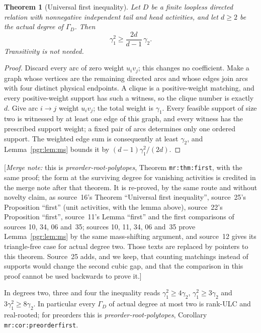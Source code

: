 \documentclass[11pt]{article}
\numberwithin{equation}{section}
\newtheorem{theorem}{Theorem}[section]\newtheorem{lemma}[theorem]{Lemma}\newtheorem{proposition}[theorem]{Proposition}\newtheorem{corollary}[theorem]{Corollary}
\theoremstyle{definition}\newtheorem{definition}[theorem]{Definition}\newtheorem{remark}[theorem]{Remark}
\newcommand{\Ga}{\Gamma}                   %
\newcommand{\mnote}[1]{[\textit{Merge note:} #1]}
\newcommand{\prp}{\emph{preorder-root-polytopes}}
\begin{document}
\begin{theorem}[Universal first inequality]\label{pgr:thm:first}
Let $D$ be a finite loopless directed relation with nonnegative independent
tail and head activities, and let $d\ge2$ be the actual degree of $\Ga_D$.
Then
\begin{equation}\label{pgr:eq:first}
 \gamma_1^2\ge\frac{2d}{d-1}\,\gamma_2 .
\end{equation}
Transitivity is not needed.
\end{theorem}
\begin{proof}
Discard every arc of zero weight $u_iv_j$; this changes no coefficient.
Make a graph whose vertices are the remaining directed arcs and whose edges
join arcs with four distinct physical endpoints. A clique is a
positive-weight matching, and every positive-weight support has such a
witness, so the clique number is exactly~$d$. Give arc $i\to j$ weight
$u_iv_j$; the total weight is $\gamma_1$. Every feasible support of size two
is witnessed by at least one edge of this graph, and every witness has the
prescribed support weight; a fixed pair of arcs determines only one ordered
support. The weighted edge sum is consequently at least $\gamma_2$, and
Lemma~\ref{pgr:lem:ms} bounds it by $(d-1)\gamma_1^2/(2d)$.
\end{proof}
\mnote{this is \prp, Theorem \texttt{mr:thm:first}, with the same proof;
the form at the surviving degree for vanishing activities is credited in
the merge note after that theorem. It is re-proved, by the same route and
without novelty claim, as source~16's Theorem ``Universal first
inequality'', source~25's Proposition ``first'' (unit activities, with the
lemma above), source~22's Proposition ``first'', source~11's Lemma
``first'' and the first comparisons of sources 10, 34, 06 and~35; sources %
10, 11, 34, 06 and~35 prove Lemma~\ref{pgr:lem:ms} by the same mass-shifting
argument, and source~12 gives its triangle-free case for actual degree two.
Those texts are replaced by pointers to this theorem. Source~25 adds, and
we keep, that counting matchings instead of supports would change the
second cubic gap, and that the comparison in this proof cannot be used
backwards to prove it.}

In degrees two, three and four the inequality reads
$\gamma_1^2\ge4\gamma_2$, $\gamma_1^2\ge3\gamma_2$ and
$3\gamma_1^2\ge8\gamma_2$. In particular every $\Ga_D$ of actual degree at
most two is rank-ULC and real-rooted; for preorders this is \prp,
Corollary \texttt{mr:cor:preorderfirst}.
\end{document}
